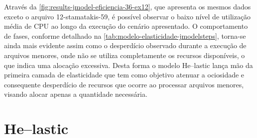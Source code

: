 \documentclass[english,brazilian]{UNISINOSmonografia} %
\begin{document}
Através da \autoref{fig:results-jmodel-eficiencia-36-ex12}, que apresenta os mesmos dados exceto o arquivo 12-stamatakis-59, é possível observar o baixo nível de utilização média de CPU ao longo da execução do cenário apresentado.
%
O comportamento de fases, conforme detalhado na \autoref{tab:modelo-elasticidade-jmodelsteps}, torna-se ainda mais evidente assim como o desperdício observado durante a execução de arquivos menores, onde não se utiliza completamente os recursos disponíveis, o que indica uma alocação excessiva.
%
Desta forma o modelo \textsf{He}--lastic lança mão da primeira camada de elasticidade que tem como objetivo atenuar a ociosidade e consequente desperdício de recursos que ocorre ao processar arquivos menores, visando alocar apenas a quantidade necessária.





\section{\textsf{He}--lastic}
\end{document}
